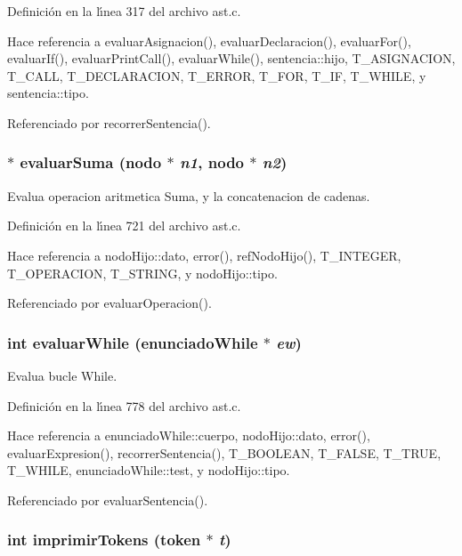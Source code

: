 Definici\'{o}n en la l\'{\i}nea 317 del archivo ast.c.

Hace referencia a evaluar\-Asignacion(), evaluar\-Declaracion(), evaluar\-For(), evaluar\-If(), evaluar\-Print\-Call(), evaluar\-While(), sentencia::hijo, T\_\-ASIGNACION, T\_\-CALL, T\_\-DECLARACION, T\_\-ERROR, T\_\-FOR, T\_\-IF, T\_\-WHILE, y sentencia::tipo.

Referenciado por recorrer\-Sentencia().
\subsubsection{$\ast$ evaluar\-Suma ({\bf nodo} $\ast$ {\em n1}, {\bf nodo} $\ast$ {\em n2})}\label{ast_8c_a38}


Evalua operacion aritmetica Suma, y la concatenacion de cadenas. 



Definici\'{o}n en la l\'{\i}nea 721 del archivo ast.c.

Hace referencia a nodo\-Hijo::dato, error(), ref\-Nodo\-Hijo(), T\_\-INTEGER, T\_\-OPERACION, T\_\-STRING, y nodo\-Hijo::tipo.

Referenciado por evaluar\-Operacion().
\subsubsection{\setlength{\rightskip}{0pt plus 5cm}int evaluar\-While ({\bf enunciado\-While} $\ast$ {\em ew})}\label{ast_8c_a40}


Evalua bucle While. 



Definici\'{o}n en la l\'{\i}nea 778 del archivo ast.c.

Hace referencia a enunciado\-While::cuerpo, nodo\-Hijo::dato, error(), evaluar\-Expresion(), recorrer\-Sentencia(), T\_\-BOOLEAN, T\_\-FALSE, T\_\-TRUE, T\_\-WHILE, enunciado\-While::test, y nodo\-Hijo::tipo.

Referenciado por evaluar\-Sentencia().
\subsubsection{\setlength{\rightskip}{0pt plus 5cm}int imprimir\-Tokens ({\bf token} $\ast$ {\em t})}\label{ast_8c_a43}


